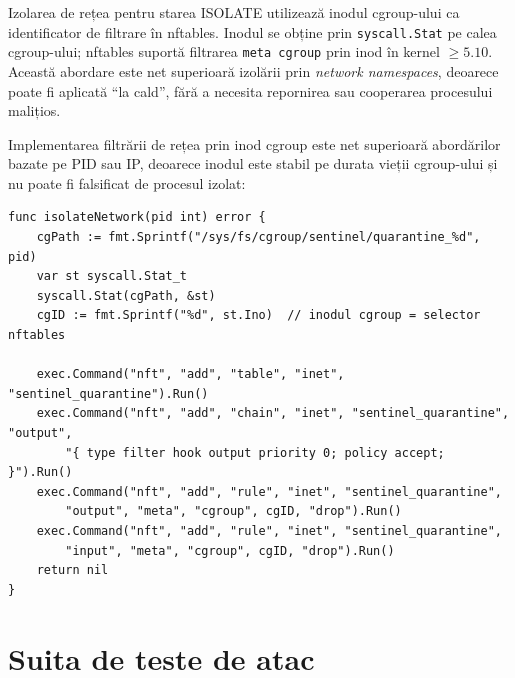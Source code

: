 \par Izolarea de rețea pentru starea ISOLATE utilizează inodul cgroup-ului ca identificator de filtrare în nftables. Inodul se obține prin \texttt{syscall.Stat} pe calea cgroup-ului; nftables suportă filtrarea \texttt{meta cgroup} prin inod în kernel $\geq 5.10$. Această abordare este net superioară izolării prin \textit{network namespaces}, deoarece poate fi aplicată ``la cald'', fără a necesita repornirea sau cooperarea procesului malițios.

\par Implementarea filtrării de rețea prin inod cgroup este net superioară abordărilor bazate pe PID sau IP, deoarece inodul este stabil pe durata vieții cgroup-ului și nu poate fi falsificat de procesul izolat:

\begin{lstlisting}[style=gostyle,caption={Izolarea de rețea via inod cgroup și nftables (\texttt{meta cgroup})}]
func isolateNetwork(pid int) error {
    cgPath := fmt.Sprintf("/sys/fs/cgroup/sentinel/quarantine_%d", pid)
    var st syscall.Stat_t
    syscall.Stat(cgPath, &st)
    cgID := fmt.Sprintf("%d", st.Ino)  // inodul cgroup = selector nftables

    exec.Command("nft", "add", "table", "inet", "sentinel_quarantine").Run()
    exec.Command("nft", "add", "chain", "inet", "sentinel_quarantine", "output",
        "{ type filter hook output priority 0; policy accept; }").Run()
    exec.Command("nft", "add", "rule", "inet", "sentinel_quarantine",
        "output", "meta", "cgroup", cgID, "drop").Run()
    exec.Command("nft", "add", "rule", "inet", "sentinel_quarantine",
        "input", "meta", "cgroup", cgID, "drop").Run()
    return nil
}
\end{lstlisting}

\section{Suita de teste de atac}
\label{sec:attack_suite}

